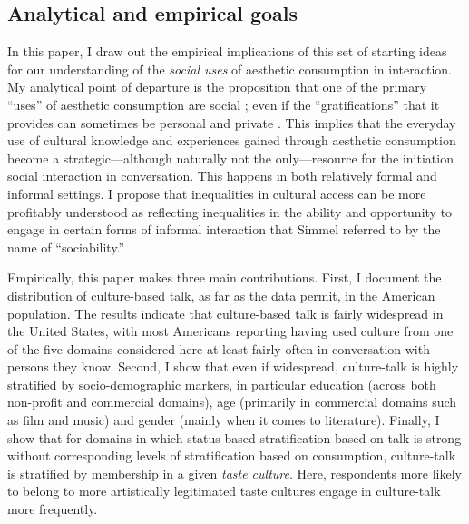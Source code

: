 \documentclass[11pt]{article}
\begin{document}
\subsection{Analytical and empirical goals}
In this paper, I draw out the empirical implications of this set of starting ideas for our understanding of the \emph{social uses} of aesthetic consumption in interaction.  My analytical point of departure is the proposition that one of the primary ``uses'' of aesthetic consumption are social \citep{dimaggio87};  even if the ``gratifications'' that it provides can sometimes be personal and private  \citep{denora00, hennion01, holbrook_hirschman82}.  This implies that the everyday use of cultural knowledge and experiences gained through aesthetic consumption become a strategic---although naturally not the only---resource for the initiation social interaction in conversation.  This happens in both relatively formal \citep{long03} and informal \citep{fine77} settings.   I propose that inequalities in cultural access can be more profitably understood as reflecting inequalities in the ability and opportunity to engage in certain forms of informal interaction that Simmel \citeyearpar{simmel49} referred to by the name of ``sociability.''  

Empirically, this paper makes three main contributions.  First, I document the distribution of culture-based talk, as far as the data permit, in the American population.  The results indicate that culture-based talk is fairly widespread in the United States, with most Americans reporting having used culture from one of the five domains considered here at least fairly often in conversation with persons they know.  Second, I show that even if widespread, culture-talk is highly stratified by socio-demographic markers, in particular education (across both non-profit and commercial domains), age (primarily in commercial domains such as film and music) and gender (mainly when it comes to literature). Finally, I show that for domains in which status-based stratification based on talk is strong without corresponding levels of stratification based on consumption, culture-talk is stratified by membership in a given \emph{taste culture}.  Here, respondents more likely to belong to more artistically legitimated taste cultures engage in culture-talk more frequently.
\end{document}
